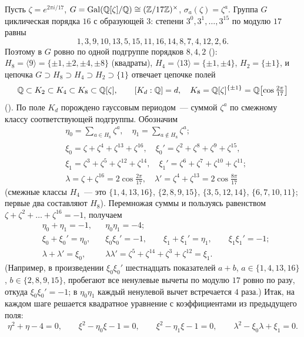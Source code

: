 \begin{example}[3.26a: семнадцатиугольник]
Пусть $\zeta=e^{2\pi i/17}$, $G=\operatorname{Gal}(\mathbb Q[\zeta]/\mathbb Q)\cong(\mathbb Z/17\mathbb Z)^\times$, $\sigma_a(\zeta)=\zeta^a$. Группа $G$ циклическая
порядка $16$ с образующей $3$: степени $3^0,3^1,\dots,3^{15}$ по модулю $17$ равны
\[
1,3,9,10,13,5,15,11,16,14,8,7,4,12,2,6 .
\]
Поэтому в $G$ ровно по одной подгруппе порядков $8,4,2$ (): $H_8=\langle 9\rangle=\{\pm1,\pm2,\pm4,\pm8\}$
(квадраты), $H_4=\langle13\rangle=\{\pm1,\pm4\}$, $H_2=\{\pm1\}$, и цепочка
$G\supset H_8\supset H_4\supset H_2\supset\{1\}$ отвечает цепочке полей
\[
\mathbb Q\subset K_2\subset K_4\subset K_8\subset\mathbb Q[\zeta],\qquad [K_d:\mathbb Q]=d,\quad K_8=\mathbb Q[\zeta]^{\{\pm1\}}=\mathbb Q\bigl[\cos\tfrac{2\pi}{17}\bigr]
\]
(). По  поле $K_d$ порождено гауссовым периодом~--- суммой $\zeta^a$ по смежному классу
соответствующей подгруппы. Обозначим
\[
\begin{aligned}
&\eta_0=\textstyle\sum_{a\in H_8}\zeta^a,\quad \eta_1=\sum_{a\notin H_8}\zeta^a;\\
&\xi_0=\zeta+\zeta^4+\zeta^{13}+\zeta^{16},\quad \xi_0'=\zeta^2+\zeta^8+\zeta^9+\zeta^{15},\\
&\xi_1=\zeta^3+\zeta^5+\zeta^{12}+\zeta^{14},\quad \xi_1'=\zeta^6+\zeta^7+\zeta^{10}+\zeta^{11};\\
&\lambda=\zeta+\zeta^{16}=2\cos\tfrac{2\pi}{17},\quad \lambda'=\zeta^4+\zeta^{13}=2\cos\tfrac{8\pi}{17}
\end{aligned}
\]
(смежные классы $H_4$~--- это $\{1,4,13,16\}$, $\{2,8,9,15\}$, $\{3,5,12,14\}$, $\{6,7,10,11\}$; первые два составляют $H_8$).
Перемножая суммы и пользуясь равенством $\zeta+\zeta^2+\dots+\zeta^{16}=-1$, получаем
\[
\begin{aligned}
&\eta_0+\eta_1=-1, && \eta_0\eta_1=-4;\\
&\xi_0+\xi_0'=\eta_0, && \xi_0\xi_0'=-1, \qquad \xi_1+\xi_1'=\eta_1,\qquad \xi_1\xi_1'=-1;\\
&\lambda+\lambda'=\xi_0, && \lambda\lambda'=\zeta^5+\zeta^{14}+\zeta^{3}+\zeta^{12}=\xi_1 .
\end{aligned}
\]
(Например, в произведении $\xi_0\xi_0'$ шестнадцать показателей $a+b$, $a\in\{1,4,13,16\}$, $b\in\{2,8,9,15\}$, пробегают
все ненулевые вычеты по модулю $17$ ровно по разу, откуда $\xi_0\xi_0'=-1$; в $\eta_0\eta_1$ каждый ненулевой вычет
встречается $4$ раза.) Итак, на каждом шаге решается квадратное уравнение с коэффициентами из предыдущего поля:
\[
\eta^2+\eta-4=0,\qquad \xi^2-\eta_0\xi-1=0,\qquad \xi^2-\eta_1\xi-1=0,\qquad \lambda^2-\xi_0\lambda+\xi_1=0 .
\]
\end{example}
